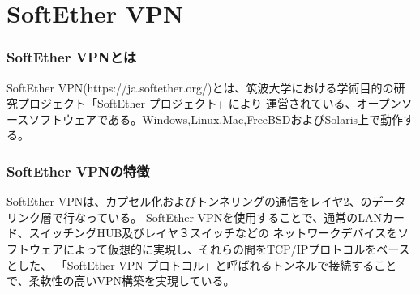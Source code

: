 \documentclass[11pt,a4j,titlepage]{jreport}
\begin{document}

\section{SoftEther VPN}\label{SoftEtherVPN}

\subsubsection*{SoftEther VPNとは}

SoftEther VPN(https://ja.softether.org/)とは、筑波大学における学術目的の研究プロジェクト「SoftEther プロジェクト」により
運営されている、オープンソースソフトウェアである。Windows,Linux,Mac,FreeBSDおよびSolaris上で動作する。

\subsubsection*{SoftEther VPNの特徴}
SoftEther VPNは、カプセル化およびトンネリングの通信をレイヤ2、のデータリンク層で行なっている。
SoftEther VPNを使用することで、通常のLANカード、スイッチングHUB及びレイヤ３スイッチなどの
ネットワークデバイスをソフトウェアによって仮想的に実現し、それらの間をTCP/IPプロトコルをベースとした、
「SoftEther VPN プロトコル」と呼ばれるトンネルで接続することで、柔軟性の高いVPN構築を実現している。
\end{document}
